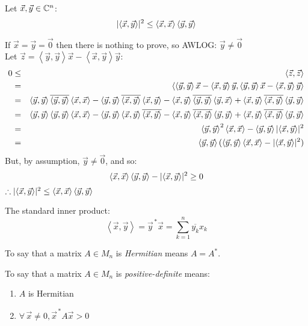 \documentclass[letterpaper,12pt,fleqn]{article}
\newcommand{\inner}[2]{\left<#1,#2\right>}
\newcommand{\vx}{\vec{x}}
\newcommand{\vy}{\vec{y}}
\newcommand{\vz}{\vec{z}}
\newcommand{\vo}{\vec{0}}
\newcommand{\conj}[1]{\overline{#1}}
\begin{document}
\begin{theorem}
  Let $\vx,\vy\in\C^n$:
  \[\abs{\inner{\vx}{\vy}}^2\le\inner{\vx}{\vx}\inner{\vy}{\vy}\]
\end{theorem}

\begin{theproof}
  If $\vx=\vy=\vo$ then there is nothing to prove, so AWLOG: $\vy\ne\vo$ \\
  Let $\vz=\inner{\vy}{\vy}\vx-\inner{\vx}{\vy}\vy$:
  \begin{eqnarray*}
    0 &\le& \inner{\vz}{\vz} \\
    &=& \inner{\inner{\vy}{\vy}\vx-\inner{\vx}{\vy}\vy}
    {\inner{\vy}{\vy}\vx-\inner{\vx}{\vy}\vy} \\
    &=& \inner{\vy}{\vy}\conj{\inner{\vy}{\vy}}\inner{\vx}{\vx}-
    \inner{\vy}{\vy}\conj{\inner{\vx}{\vy}}\inner{\vx}{\vy}-
    \inner{\vx}{\vy}\conj{\inner{\vy}{\vy}}\inner{\vy}{\vx}+
    \inner{\vx}{\vy}\conj{\inner{\vx}{\vy}}\inner{\vy}{\vy} \\
    &=& \inner{\vy}{\vy}\inner{\vy}{\vy}\inner{\vx}{\vx}-
    \inner{\vy}{\vy}\inner{\vx}{\vy}\conj{\inner{\vx}{\vy}}-
    \inner{\vx}{\vy}\conj{\inner{\vx}{\vy}}\inner{\vy}{\vy}+
    \inner{\vx}{\vy}\conj{\inner{\vx}{\vy}}\inner{\vy}{\vy} \\
    &=& \inner{\vy}{\vy}^2\inner{\vx}{\vx}-\inner{\vy}{\vy}\abs{\inner{\vx}{\vy}}^2 \\
    &=& \inner{\vy}{\vy}(\inner{\vy}{\vy}\inner{\vx}{\vx}-\abs{\inner{\vx}{\vy}}^2)
  \end{eqnarray*}
  But, by assumption, $\vy\ne\vo$, and so:
  \[\inner{\vx}{\vx}\inner{\vy}{\vy}-\abs{\inner{\vx}{\vy}}^2\ge0\]
  $\therefore\abs{\inner{\vx}{\vy}}^2\le\inner{\vx}{\vx}\inner{\vy}{\vy}$
\end{theproof}

\begin{example}
  The standard inner product:
  \[\inner{\vx}{\vy}=\vy^{\,*}\vx=\sum_{k=1}^n\conj{y_k}x_k\]
\end{example}

\begin{definition}
  To say that a matrix $A\in M_n$ is \emph{Hermitian} means $A=A^*$.

  To say that a matrix $A\in M_n$ is \emph{positive-definite} means:
  \begin{enumerate}
    \item $A$ is Hermitian
    \item $\forall\,\vx\ne0,\vx^{\,*}A\vx>0$
  \end{enumerate}
\end{definition}
\end{document}
